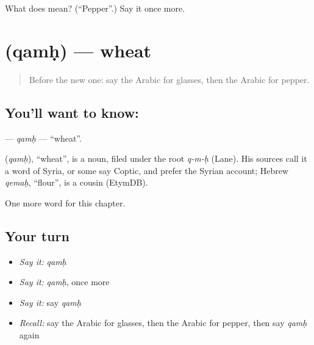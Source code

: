 \begin{tcolorbox}[breakable,colback=teal!4,colframe=teal!35!black,title={Before you move on}]
What does  mean? (\textquotedblleft{}Pepper\textquotedblright{}.) Say it once more.
\end{tcolorbox}
\section[\texorpdfstring{\ar{قمح} (qamḥ)}{قمح (qamḥ)}]{ (qamḥ) — wheat}

\label{lesson:AR-C128-qamh}



\begin{quote}
Before the new one: say the Arabic for glasses, then the Arabic for pepper.
\end{quote}

\subsection*{You'll want to know: }
\textbf{} — \emph{qamḥ} — \textquotedblleft{}wheat\textquotedblright{}.

\begin{cousinweb}
\textbf{} (\emph{qamḥ}), \textquotedblleft{}wheat\textquotedblright{}, is a noun, filed under the root \emph{q-m-ḥ} (Lane). His sources call it a word of Syria, or some say Coptic, and prefer the Syrian account; Hebrew \emph{qemaḥ}, \textquotedblleft{}flour\textquotedblright{}, is a cousin (EtymDB).
\end{cousinweb}

\begin{grammarlens}[title={What you've built}]
One more word for this chapter.
\end{grammarlens}

\subsection*{Your turn}
\begin{itemize}
\raggedright
  \item \emph{Say it:} \emph{qamḥ}
  \item \emph{Say it:} \emph{qamḥ}, once more
  \item \emph{Say it:} say \emph{qamḥ}
  \item \emph{Recall:} say the Arabic for glasses, then the Arabic for pepper, then say \emph{qamḥ} again
\end{itemize}

